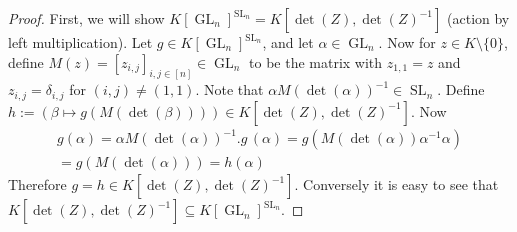 \begin{proof}
  First, we will show $ K \left\lbrack \operatorname{GL}_n \right\rbrack ^{\operatorname{SL}_n} = K \left\lbrack \operatorname{det} (Z) , \operatorname{det} (Z) ^{-1} \right\rbrack $ (action by left multiplication).
  Let $g \in K \left\lbrack \operatorname{GL}_n \right\rbrack ^{ \operatorname{SL}_n }$, and let $ \alpha \in \operatorname{GL}_n $.
  Now for $z \in K \setminus \{0\}$, define $M(z) = [z_{i,j}]_{i,j \in [n]} \in \operatorname{GL}_n$ to be the matrix with $z_{1,1} = z$ and $z_{i,j} = \delta_{i,j}$ for $(i,j) \neq (1,1)$.
  Note that $\alpha M \left( \operatorname{det}(\alpha) \right)^{-1} \in \operatorname{SL}_n$.
  Define $ h := \left( \beta \mapsto g \left( M(\operatorname{det}(\beta)) \right) \right) \in K \left\lbrack \operatorname{det} (Z) , \operatorname{det} (Z) ^{-1} \right\rbrack $.
  Now
  \begin{equation}
    \begin{aligned}
      g ( \alpha )
      = \alpha M \left( \operatorname{det}(\alpha) \right)^{-1} . g \, (\alpha)
      = g \left( M \left( \operatorname{det}(\alpha) \right) \alpha ^{-1} \alpha \right) \\
      = g \left( M \left( \operatorname{det}(\alpha) \right) \right)
      = h (\alpha)
    \end{aligned}
  \end{equation}
  Therefore $ g = h \in K \left\lbrack \operatorname{det} (Z) , \operatorname{det} (Z) ^{-1} \right\rbrack $.
  Conversely it is easy to see that $ K \left\lbrack \operatorname{det} (Z) , \operatorname{det} (Z) ^{-1} \right\rbrack \subseteq K \left\lbrack \operatorname{GL}_n \right\rbrack ^{\operatorname{SL}_n } $.


\end{proof}
